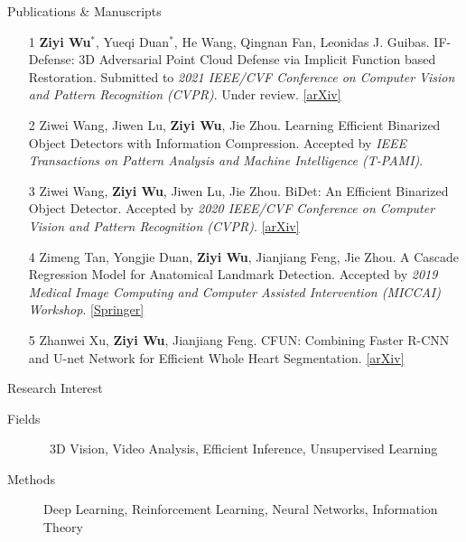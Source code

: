 \documentclass{resume} %
\begin{document}
\begin{rSection}{Publications \& Manuscripts}

\begin{enumerate}
\item[1] \textbf{Ziyi Wu}$^{*}$, Yueqi Duan$^{*}$, He Wang, Qingnan Fan, Leonidas J. Guibas. IF-Defense: 3D Adversarial Point Cloud Defense via Implicit Function based Restoration. Submitted to \textit{2021 IEEE/CVF Conference on Computer Vision and Pattern Recognition (CVPR)}. Under review. \href{https://arxiv.org/abs/2010.05272}{[\underline{arXiv}]}
\item[2] Ziwei Wang, Jiwen Lu, \textbf{Ziyi Wu}, Jie Zhou. Learning Efficient Binarized Object Detectors with Information Compression. Accepted by \textit{IEEE Transactions on Pattern Analysis and Machine Intelligence (T-PAMI)}.
\item[3] Ziwei Wang, \textbf{Ziyi Wu}, Jiwen Lu, Jie Zhou. BiDet: An Efficient Binarized Object Detector. Accepted by \textit{2020 IEEE/CVF Conference on Computer Vision and Pattern Recognition (CVPR)}. \href{https://arxiv.org/abs/2003.03961}{[\underline{arXiv}]}
\item[4] Zimeng Tan, Yongjie Duan, \textbf{Ziyi Wu}, Jianjiang Feng, Jie Zhou. A Cascade Regression Model for Anatomical Landmark Detection. Accepted by \textit{2019 Medical Image Computing and Computer Assisted Intervention (MICCAI) Workshop}. \href{https://link.springer.com/chapter/10.1007/978-3-030-39074-7_5}{[\underline{Springer}]}
\item[5] Zhanwei Xu, \textbf{Ziyi Wu}, Jianjiang Feng. CFUN: Combining Faster R-CNN and U-net Network for Efficient Whole Heart Segmentation. \href{https://arxiv.org/abs/1812.04914}{[\underline{arXiv}]}
\end{enumerate}

\end{rSection}


\begin{rSection}{Research Interest}

\begin{description}
    \item[Fields] \quad\quad\, 
    3D Vision, 
    Video Analysis, 
    Efficient Inference, 
    Unsupervised Learning
    \item[Methods] \quad Deep Learning, 
    Reinforcement Learning, 
    Neural Networks, 
    Information Theory
    \newline
\end{description}

\end{rSection}
\end{document}
